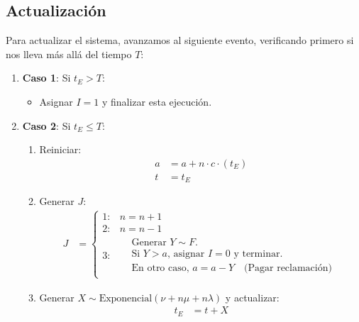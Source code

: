\documentclass[12pt, a4paper]{article}
\begin{document}
\subsection*{Actualización}
Para actualizar el sistema, avanzamos al siguiente evento, verificando primero si nos lleva más allá del tiempo $T$:

\begin{enumerate}
    \item \textbf{Caso 1}: Si $t_E > T$:
    \begin{itemize}
        \item Asignar $I = 1$ y finalizar esta ejecución.
    \end{itemize}
    
    \item \textbf{Caso 2}: Si $t_E \leq T$:
    \begin{enumerate}
        \item Reiniciar:
        \begin{align*}
            a &= a + n \cdot c \cdot (t_E)  \\
            t &= t_E \quad 
        \end{align*}
        
        \item Generar $J$:
        \begin{align*}
            J &= 
            \begin{cases}
                1: & n = n + 1 \\
                2: & n = n - 1  \\
                3: & 
                \begin{aligned}
                    &\text{Generar } Y \sim F. \\
                    &\text{Si } Y > a \text{, asignar } I = 0 \text{ y terminar.} \\
                    &\text{En otro caso, } a = a - Y \quad \text{(Pagar reclamación)}
                \end{aligned}
            \end{cases}
        \end{align*}
        
        \item Generar $X \sim \text{Exponencial}(\nu + n\mu + n\lambda)$ y actualizar:
        \begin{align*}
            t_E &= t + X
        \end{align*}
    \end{enumerate}
\end{enumerate}
\end{document}
